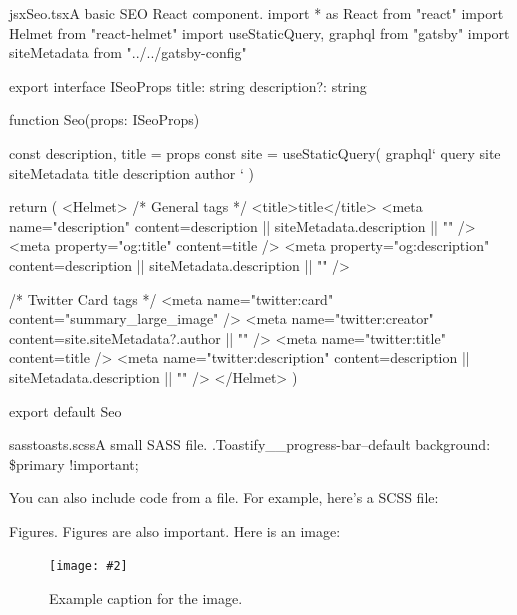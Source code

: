 \documentclass[a4paper,headinclude=on,footinclude=on,12pt,oneside]{scrbook}
\newcommand{\standardfigure}[3]{\begin{figure}[H]\begin{center}\texttt{[image: \#2]}\caption{#3}\label{fig:#2}\end{center}\end{figure}}
\begin{document}
\begin{codeInput}{jsx}{Seo.tsx}{A basic SEO React component.}
import * as React from "react"
import { Helmet } from "react-helmet"
import { useStaticQuery, graphql } from "gatsby"
import { siteMetadata } from "../../gatsby-config"

export interface ISeoProps {
  title: string
  description?: string
}

function Seo(props: ISeoProps) {
  const { description, title } = props
  const { site } = useStaticQuery(
    graphql`
      query {
        site {
          siteMetadata {
            title
            description
            author
          }
        }
      }
    `
  )

  return (
    <Helmet>
      {/* General tags */}
      <title>{title}</title>
      <meta
        name="description"
        content={description || siteMetadata.description || ""}
      />
      <meta property="og:title" content={title} />
      <meta
        property="og:description"
        content={description || siteMetadata.description || ""}
      />

      {/* Twitter Card tags */}
      <meta name="twitter:card" content="summary_large_image" />
      <meta name="twitter:creator" content={site.siteMetadata?.author || ""} />
      <meta name="twitter:title" content={title} />
      <meta
        name="twitter:description"
        content={description || siteMetadata.description || ""}
      />
    </Helmet>
  )
}

export default Seo
\end{codeInput}

\begin{codeInput}{sass}{toasts.scss}{A small SASS file.}
.Toastify__progress-bar--default {
  background: \$primary !important;
}
\end{codeInput}

You can also include code from a file. For example, here's a SCSS file:




Figures. Figures are also important. Here is an image:

\standardfigure{\textwidth/2}{folder-one/example}{Example caption for the image.}
\end{document}
